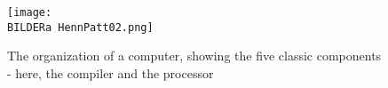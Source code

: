 
\begin{figure}[H] 
\centering
  \texttt{[image: \\BILDERa HennPatt02.png]}
\caption{The organization of a computer, showing the five classic components \cite{patterson2017} - here, the compiler and the processor}
\label{fig:asISAARM01}
\end{figure}
